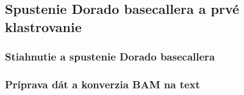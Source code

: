 \subsection{Spustenie Dorado basecallera a prvé klastrovanie}

\subsubsection{Stiahnutie a spustenie Dorado basecallera}


\subsubsection{Príprava dát a konverzia BAM na text}


%

%

%

